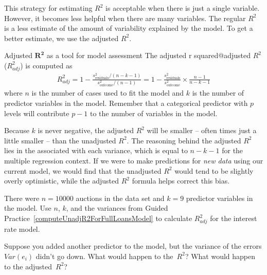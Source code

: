 This strategy for estimating $R^2$ is acceptable when there
is just a single variable.
However, it becomes less helpful when there are many
variables.
The regular $R^2$ is a less estimate of the amount of
variability explained by the model.
To get a better estimate, we use the adjusted $R^2$.

\begin{onebox}{Adjusted $\pmb{R^2}$ as a tool for
    model assessment}
  The 
      {adjusted r squared@adjusted $R^2$ ($R_{adj}^2$)}
  is computed as
  \begin{align*}
  R_{adj}^{2}
    = 1 - \frac{s_{\text{residuals}}^2 / (n-k-1)}
        {s_{\text{outcome}}^2 / (n-1)}
    = 1 - \frac{s_{\text{residuals}}^2}{s_{\text{outcome}}^2}
        \times \frac{n-1}{n-k-1}
  \end{align*}
  where $n$ is the number of cases used to fit the model
  and $k$ is the number of predictor variables in the model.
  Remember that a categorical predictor with $p$ levels will
  contribute $p - 1$ to the number of variables in the model.
\end{onebox}

Because $k$ is never negative, the adjusted $R^2$ will be
smaller -- often times just a little smaller -- than the
unadjusted $R^2$.
The reasoning behind the adjusted $R^2$ lies in the
associated with each variance,
which is equal to $n - k - 1$ for the multiple regression
context.
If we were to make predictions for \emph{new data}
using our current model, we would find that the unadjusted
$R^2$ would tend to be slightly overly optimistic, while
the adjusted $R^2$ formula helps correct this bias.

\begin{exercisewrap}
\begin{nexercise}
There were $n=10000$ auctions in the  data set
and $k=9$ predictor variables in the model.
Use $n$, $k$, and the variances from
Guided Practice~\ref{computeUnadjR2ForFullLoansModel}
to calculate $R_{adj}^2$ for the interest rate
model.\footnotemark
\end{nexercise}
\end{exercisewrap}

\begin{exercisewrap}
\begin{nexercise}
Suppose you added another predictor to the model, but the
variance of the errors $Var(e_i)$ didn't go down.
What would happen to the~$R^2$?
What would happen to the
adjusted~$R^2$?\hspace{0.7mm}\footnotemark
\end{nexercise}
\end{exercisewrap}

